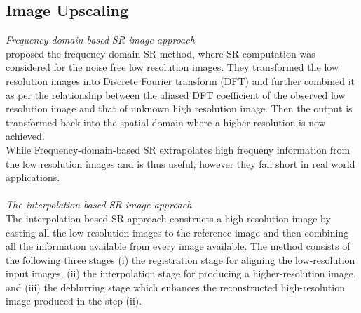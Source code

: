 \documentclass[conference]{IEEEtran}
\begin{document}
\subsection{Image Upscaling}
\textit{Frequency-domain-based SR image approach}\\
\hspace*{0.25 in} \cite{tsai1984multiframe} proposed the frequency domain SR method, where SR computation was considered for the noise free low resolution images. They transformed the low resolution images into Discrete Fourier transform (DFT) and further combined it as per the relationship between the aliased DFT coefficient of the observed low resolution image and that of unknown high resolution image. Then the output is transformed back into the spatial domain where a higher resolution is now achieved.\\
\hspace*{0.25 in} While Frequency-domain-based SR extrapolates high frequeny information from the low resolution images and is thus useful, however they fall short in real world applications.\\ \\
\hspace*{0.1 in}\textit{The interpolation based SR image approach}\\
\hspace*{0.25 in} The interpolation-based SR approach constructs a high resolution image by casting all the low resolution images to the reference image and then combining all the information available from every image available.
The method consists of the following three stages
(i) the registration stage for aligning the low-resolution input images,
(ii) the interpolation stage for producing a higher-resolution image, and
(iii) the deblurring stage which enhances the
reconstructed high-resolution image produced in the step (ii).
\end{document}
